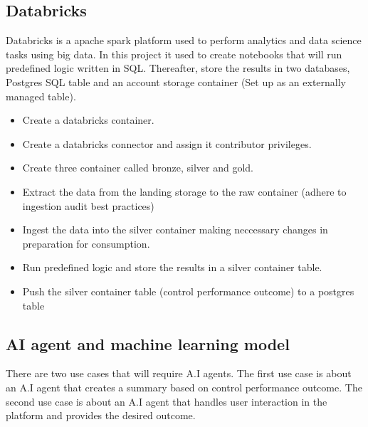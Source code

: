\documentclass{article}
\begin{document}
\subsection{Databricks}
Databricks is a apache spark platform used to perform analytics and data science tasks using big data. In this project it used to
create notebooks that will run predefined logic written in SQL. Thereafter, store the results in two databases, Postgres SQL table and 
an account storage container (Set up as an externally managed table).
\begin{itemize}
    \item  Create a databricks container. 
    \item  Create a databricks connector and assign it contributor privileges.
    \item  Create three container called bronze, silver and gold.
    \item  Extract the data from the landing storage to the raw container (adhere to ingestion audit best practices)
    \item  Ingest the data into the silver container making neccessary changes in preparation for consumption.
    \item  Run predefined logic and store the results in a silver container table.
    \item  Push the silver container table (control performance outcome) to a postgres table
\end{itemize}

\subsection{AI agent and machine learning model}
There are two use cases that will require A.I agents. The first use case is about an A.I agent that creates a summary 
based on control performance outcome. The second use case is about an A.I agent that handles user interaction in the platform and provides 
the desired outcome.\\
\end{document}
